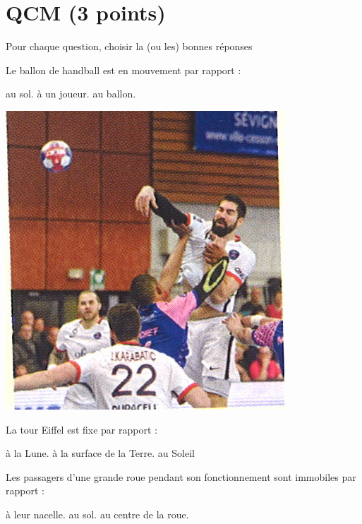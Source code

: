 \section{QCM (3 points)}

Pour chaque question, choisir la (ou les) bonnes réponses

\begin{questions}
	
	\begin{multicols}{2}
		
		\question[\half] Le ballon de handball est en mouvement par rapport :
	
	
	
		
	\begin{checkboxes}
		\correctchoice au sol.
		\correctchoice à un joueur.
		\choice au ballon.
	\end{checkboxes}

	\begin{center}
		\includegraphics[scale=0.3]{hand}
	\end{center}
	\end{multicols}

	\question[\half] La tour Eiffel est fixe par rapport :\\
	\begin{oneparcheckboxes}
		\choice à la Lune.
		\correctchoice à la surface de la Terre.
		\choice au Soleil
	\end{oneparcheckboxes}

	\question[\half] Les passagers d'une grande roue pendant son fonctionnement sont immobiles par rapport :
	\begin{oneparcheckboxes}
		\correctchoice à leur nacelle.
		\choice au sol.
		\choice au centre de la roue.
	\end{oneparcheckboxes}




\end{questions}
